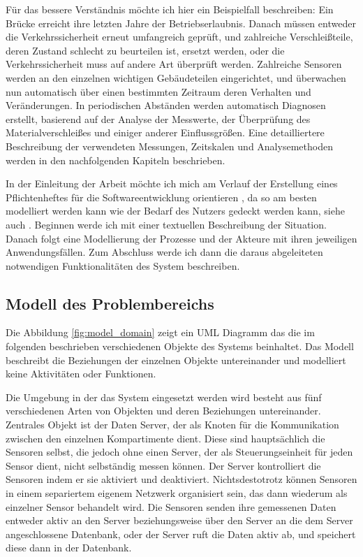 Für das bessere Verständnis möchte ich hier ein Beispielfall beschreiben: Ein Brücke erreicht ihre letzten Jahre der Betriebserlaubnis. Danach müssen entweder die Verkehrssicherheit erneut umfangreich geprüft, und zahlreiche Verschleißteile, deren Zustand schlecht zu beurteilen ist, ersetzt werden, oder die Verkehrssicherheit muss auf andere Art überprüft werden. Zahlreiche Sensoren werden an den einzelnen wichtigen Gebäudeteilen eingerichtet, und überwachen nun automatisch über einen bestimmten Zeitraum deren Verhalten und Veränderungen. In periodischen Abständen werden automatisch Diagnosen erstellt, basierend auf der Analyse der Messwerte, der Überprüfung des Materialverschleißes und einiger anderer Einflussgrößen. Eine detailliertere Beschreibung der verwendeten Messungen, Zeitskalen und Analysemethoden werden in den nachfolgenden Kapiteln beschrieben.

In der Einleitung der Arbeit möchte ich mich am Verlauf der Erstellung eines Pflichtenheftes für die Softwareentwicklung orientieren , da so am besten modelliert werden kann wie der Bedarf des Nutzers gedeckt werden kann, siehe auch \citep{engels_vorlesung_2006}. Beginnen werde ich mit einer textuellen Beschreibung der Situation. Danach folgt eine Modellierung der Prozesse und der Akteure mit ihren jeweiligen Anwendungsfällen. Zum Abschluss werde ich dann die daraus abgeleiteten notwendigen Funktionalitäten des System beschreiben.


\subsection{Modell des Problembereichs}
Die Abbildung \ref{fig:model_domain} zeigt ein  \gls{UML} Diagramm das die im folgenden beschrieben verschiedenen Objekte des Systems beinhaltet. Das Modell beschreibt die Beziehungen der einzelnen Objekte untereinander und modelliert keine Aktivitäten oder Funktionen.

Die Umgebung in der das System eingesetzt werden wird besteht aus fünf verschiedenen Arten von Objekten und deren Beziehungen untereinander. Zentrales Objekt ist der Daten Server, der als Knoten für die Kommunikation zwischen den einzelnen Kompartimente dient. Diese sind hauptsächlich die Sensoren selbst, die jedoch ohne einen Server, der als Steuerungseinheit für jeden Sensor dient, nicht selbständig messen können. Der Server kontrolliert die Sensoren indem er sie aktiviert und deaktiviert. Nichtsdestotrotz können Sensoren in einem separiertem eigenem Netzwerk organisiert sein, das dann wiederum als einzelner Sensor behandelt wird. Die Sensoren senden ihre gemessenen Daten entweder aktiv an den Server beziehungsweise über den Server an die dem Server angeschlossene Datenbank, oder der Server ruft die Daten aktiv ab, und speichert diese dann in der Datenbank.

